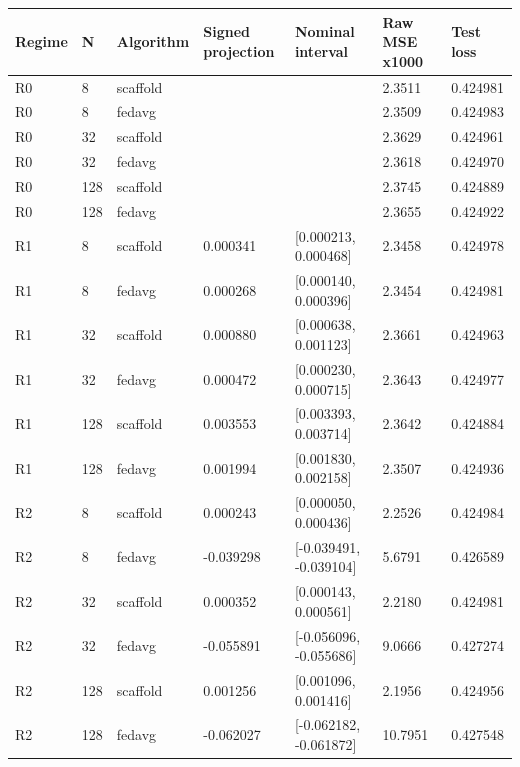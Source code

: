 \begin{tabular}{lllllll}
Regime & N & Algorithm & Signed projection & Nominal interval & Raw MSE x1000 & Test loss \\
\hline
R0 & 8 & scaffold &  &  & 2.3511 & 0.424981 \\
R0 & 8 & fedavg &  &  & 2.3509 & 0.424983 \\
R0 & 32 & scaffold &  &  & 2.3629 & 0.424961 \\
R0 & 32 & fedavg &  &  & 2.3618 & 0.424970 \\
R0 & 128 & scaffold &  &  & 2.3745 & 0.424889 \\
R0 & 128 & fedavg &  &  & 2.3655 & 0.424922 \\
R1 & 8 & scaffold & 0.000341 & [0.000213, 0.000468] & 2.3458 & 0.424978 \\
R1 & 8 & fedavg & 0.000268 & [0.000140, 0.000396] & 2.3454 & 0.424981 \\
R1 & 32 & scaffold & 0.000880 & [0.000638, 0.001123] & 2.3661 & 0.424963 \\
R1 & 32 & fedavg & 0.000472 & [0.000230, 0.000715] & 2.3643 & 0.424977 \\
R1 & 128 & scaffold & 0.003553 & [0.003393, 0.003714] & 2.3642 & 0.424884 \\
R1 & 128 & fedavg & 0.001994 & [0.001830, 0.002158] & 2.3507 & 0.424936 \\
R2 & 8 & scaffold & 0.000243 & [0.000050, 0.000436] & 2.2526 & 0.424984 \\
R2 & 8 & fedavg & -0.039298 & [-0.039491, -0.039104] & 5.6791 & 0.426589 \\
R2 & 32 & scaffold & 0.000352 & [0.000143, 0.000561] & 2.2180 & 0.424981 \\
R2 & 32 & fedavg & -0.055891 & [-0.056096, -0.055686] & 9.0666 & 0.427274 \\
R2 & 128 & scaffold & 0.001256 & [0.001096, 0.001416] & 2.1956 & 0.424956 \\
R2 & 128 & fedavg & -0.062027 & [-0.062182, -0.061872] & 10.7951 & 0.427548 \\
\end{tabular}
